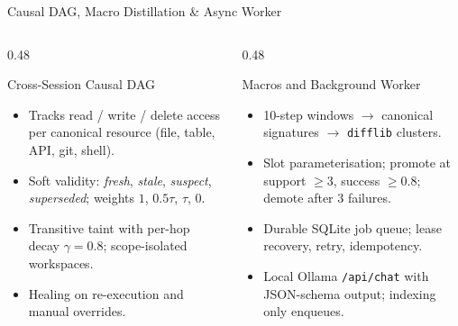 \documentclass[aspectratio=169,10pt]{beamer}
\begin{document}
\begin{frame}{Causal DAG, Macro Distillation \& Async Worker}
  \begin{columns}[T,onlytextwidth]
    \begin{column}{0.48\textwidth}
      \begin{block}{Cross-Session Causal DAG}
        \begin{itemize}
          \footnotesize
          \item Tracks read / write / delete access per canonical resource (file, table, API, git, shell).
          \item Soft validity: \textit{fresh}, \textit{stale}, \textit{suspect}, \textit{superseded}; weights $1$, $0.5\tau$, $\tau$, $0$.
          \item Transitive taint with per-hop decay $\gamma = 0.8$; scope-isolated workspaces.
          \item Healing on re-execution and manual overrides.
        \end{itemize}
      \end{block}
    \end{column}
    \begin{column}{0.48\textwidth}
      \begin{block}{Macros and Background Worker}
        \begin{itemize}
          \footnotesize
          \item 10-step windows $\rightarrow$ canonical signatures $\rightarrow$ \texttt{difflib} clusters.
          \item Slot parameterisation; promote at support $\geq 3$, success $\geq 0.8$; demote after 3 failures.
          \item Durable SQLite job queue; lease recovery, retry, idempotency.
          \item Local Ollama \texttt{/api/chat} with JSON-schema output; indexing only enqueues.
        \end{itemize}
      \end{block}
    \end{column}
  \end{columns}
\end{frame}
\end{document}

